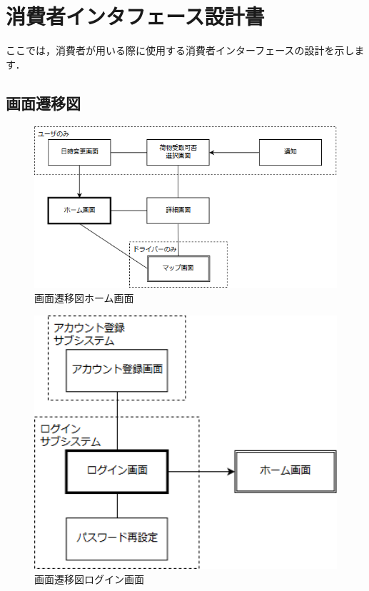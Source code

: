 \documentclass[a4j,titlepage]{jarticle}
\begin{document}
\newpage

\section{消費者インタフェース設計書}
ここでは，消費者が用いる際に使用する消費者インターフェースの設計を示します．

\subsection{画面遷移図}

\begin{figure}[H]
 \begin{center}
  \includegraphics[width=150mm]{screen_transition_home.png}
	\caption{画面遷移図ホーム画面}
	\label{fig:screen_transition_home}
 \end{center}

\end{figure}

\begin{figure}[H]
 \begin{center}
  \includegraphics[width=130mm]{screen_transition_login.png}
	\caption{画面遷移図ログイン画面}
	\label{fig:screen_transition_login}
 \end{center}

\end{figure}
\end{document}

